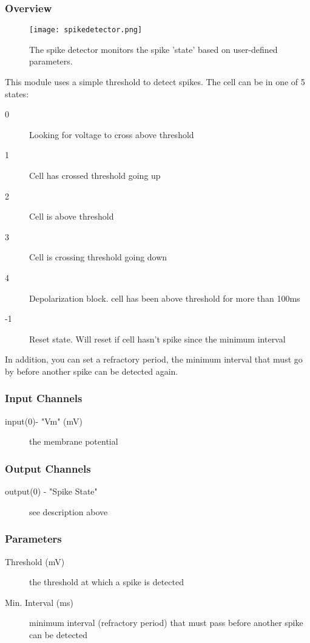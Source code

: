 \subsubsection{Overview}
\label{Spike Detector}

\begin{figure}[h]
\begin{center}
\texttt{[image: spikedetector.png]} 
\caption[Spike Detector]{The spike detector monitors the spike 
'state' based on user-defined parameters.} 
\end{center}
\label{spikedetector}
\end{figure}

This module uses a simple threshold to detect spikes. The cell can be in one of 5 states:
\begin{description}
 \item[0] Looking for voltage to cross above threshold
 \item[1] Cell has crossed threshold going up
 \item[2] Cell is above threshold
 \item[3] Cell is crossing threshold going down
 \item[4] Depolarization block. cell has been above threshold for more than 100ms
 \item[-1] Reset state. Will reset if cell hasn’t spike since the minimum interval
\end{description}

In addition, you can set a refractory period, the minimum interval that must go by before another spike can be detected again.

\subsubsection{Input Channels}
\begin{description}
\item[input(0)- "Vm" (mV)] the membrane potential
\end{description}

\subsubsection{Output Channels}
\begin{description}
\item[output(0) - "Spike State"] see description above
\end{description}

\subsubsection{Parameters}
\begin{description}
\item[Threshold (mV)] the threshold at which a spike is detected
\item[Min. Interval (ms)] minimum interval (refractory period) that must pass before another spike can be detected
\end{description}